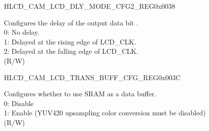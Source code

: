 \begin{register}{H}{LCD\_CAM\_LCD\_DLY\_MODE\_CFG2\_REG}{0x0038}\label{regdesc:LCDCAMLCDDLYMODECFG2REG}
%
%
%
%
%
%
%
%
%
%
%
%
%
%
%
%
\regnewline%
\begin{regdesc}\begin{reglist}
\label{fielddesc:LCDCAMDOUT0MODE}\item [LCD\_CAM\_DOUT\regindex{n}\_MODE (\regindex{n}: 0 - 15)] Configures the delay of the output data bit .\\
0: No delay.\\
1: Delayed at the rising edge of LCD\_CLK.\\
2: Delayed at the falling edge of LCD\_CLK.\\
(R/W)
\end{reglist}\end{regdesc}
\end{register}

\begin{register}{H}{LCD\_CAM\_LCD\_TRANS\_BUFF\_CFG\_REG}{0x003C}\label{regdesc:LCDCAMLCDTRANSBUFFCFGREG}
%
%
\regnewline%
\begin{regdesc}\begin{reglist}
\label{fielddesc:LCDCAMLCDTRANSBUFFERENA}\item [LCD\_CAM\_LCD\_TRANS\_BUFFER\_ENA] Configures whether to use SRAM as a data buffer.\\
0: Disable\\
1: Enable (YUV420 upsampling color conversion must be disabled)\\
(R/W)
\end{reglist}\end{regdesc}
\end{register}

